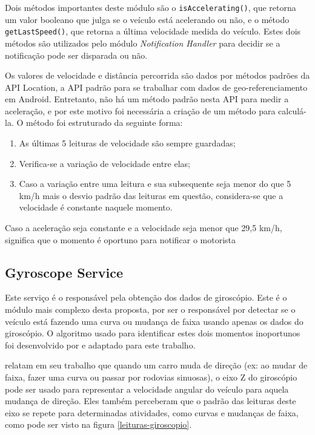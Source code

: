 Dois métodos importantes deste módulo são o \lstinline[basicstyle=\ttfamily\color{black}]|isAccelerating()|, que retorna um valor
booleano que julga se o veículo está acelerando ou não, e o método \lstinline[basicstyle=\ttfamily\color{black}]|getLastSpeed()|, que
retorna a última velocidade medida do veículo. Estes dois métodos são utilizados pelo módulo \textit{Notification Handler} para decidir se
a notificação pode ser disparada ou não.

Os valores de velocidade e distância percorrida são dados por métodos padrões da API Location, a API padrão para se trabalhar
com dados de geo-referenciamento em Android. Entretanto, não há um método padrão nesta API para medir a aceleração, e por este
motivo foi necessária a criação de um método para calculá-la. O método foi estruturado da seguinte forma:

\begin{enumerate}
  \item As últimas 5 leituras de velocidade são sempre guardadas;
  \item Verifica-se a variação de velocidade entre elas;
  \item Caso a variação entre uma leitura e sua subsequente seja menor do que 5 km/h mais o desvio padrão das leituras em questão,
  considera-se que a velocidade é constante naquele momento.
\end{enumerate}

Caso a aceleração seja constante e a velocidade seja menor que 29,5 km/h, significa que o momento é oportuno para notificar o motorista

\subsection{Gyroscope Service}
\label{gyroscope-service}

Este serviço é o responsável pela obtenção dos dados de giroscópio. Este é o módulo mais complexo desta proposta, por ser o responsável por
detectar se o veículo está fazendo uma curva ou mudança de faixa usando apenas os dados do giroscópio. O algoritmo usado para identificar
estes dois momentos inoportunos foi desenvolvido por  e adaptado para este trabalho.

 relatam em seu trabalho que quando um carro muda de direção (ex: ao mudar de faixa, fazer uma curva ou passar
por rodovias sinuosas), o eixo Z do giroscópio pode ser usado para representar a velocidade angular do veículo para aquela mudança de direção.
Eles também perceberam que o padrão das leituras deste eixo se repete para determinadas atividades, como curvas e mudanças de faixa, como pode
ser visto na figura \ref{leituras-giroscopio}.

